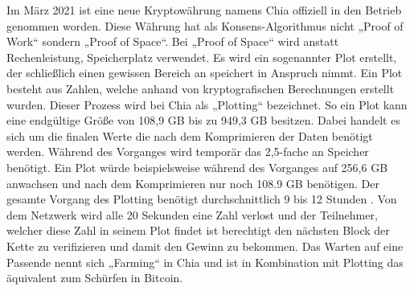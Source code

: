 Im März 2021 ist eine neue Kryptowährung namens Chia offiziell in den Betrieb genommen worden. Diese Währung hat als Konsens-Algorithmus nicht „Proof of Work“ sondern „Proof of Space“. Bei „Proof of Space“ wird anstatt Rechenleistung, Speicherplatz verwendet. Es wird ein sogenannter Plot erstellt, der schließlich einen gewissen Bereich an speichert in Anspruch nimmt. Ein Plot besteht aus Zahlen, welche anhand von kryptografischen Berechnungen erstellt wurden. Dieser Prozess wird bei Chia als „Plotting“ bezeichnet. So ein Plot kann eine endgültige Größe von 108,9 GB bis zu 949,3 GB \cite{hoffman_plot_2021} besitzen. Dabei handelt es sich um die finalen Werte die nach dem Komprimieren der Daten benötigt werden. Während des Vorganges wird temporär das 2,5-fache an Speicher benötigt. Ein Plot würde beispielsweise während des Vorganges auf 256,6 GB anwachsen und nach dem Komprimieren nur noch 108.9 GB benötigen. Der gesamte Vorgang des Plotting benötigt durchschnittlich 9 bis 12 Stunden \cite{hoffman_chia_2021}. Von dem Netzwerk wird alle 20 Sekunden eine Zahl verlost und der Teilnehmer, welcher diese Zahl in seinem Plot findet ist berechtigt den nächsten Block der Kette zu verifizieren und damit den Gewinn zu bekommen. Das Warten auf eine Passende nennt sich „Farming“ in Chia und ist in Kombination mit Plotting das äquivalent zum Schürfen in Bitcoin.
\clearpage
